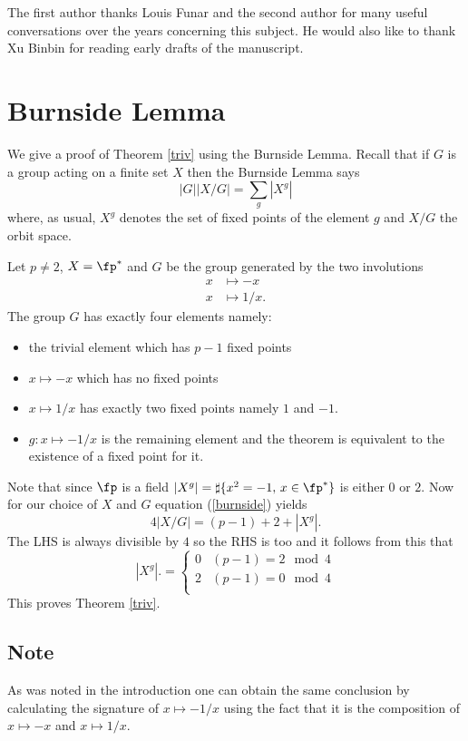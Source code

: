 The first author thanks Louis Funar and the second author for  many useful conversations over the years concerning this subject. He would also like to thank Xu Binbin for reading early drafts of the manuscript.


\section{Burnside Lemma}

We give a proof of Theorem \ref{triv} using the Burnside Lemma.
Recall that if $G$ is  a group acting on a finite set $X$ then the Burnside Lemma says
\begin{equation}\label{burnside}
|G| |X/G| = \sum_{g} |X^g| 
\end{equation}  
where, as usual, 
 $X^g$ denotes the set of fixed points of the element $g$ 
 and $X/G$  the orbit space.


Let $p\neq 2$,  $X = \fp^*$ and $G$ be the group generated by the two involutions
\begin{eqnarray*}
x & \mapsto -x \\
x & \mapsto 1/x.
\end{eqnarray*}
The group  $G$ has exactly four elements namely:
\begin{itemize}
\item the trivial element which has  $p-1$ fixed points
\item $x\mapsto -x$ which has no fixed points 
\item  $x\mapsto 1/x$ has exactly two fixed points namely $1$ and $-1$.
\item  $g:x \mapsto -1/x$ is the remaining element and the theorem is equivalent to the existence of a fixed point for it.
\end{itemize}
Note that since $\fp$ is a field 
$|X^g| = \sharp \{x^2 = -1, \, x\in \fp^* \}$
is either $0$ or $2$.
Now for our choice of $X$ and $G$ equation (\ref{burnside}) yields
\begin{equation}
4 |X/G|   = (p-1) + 2 + |X^g|.
\end{equation}  
The LHS is always divisible by $4$ so the  RHS is too and
it follows from this that
$$ |X^g|. = \left\{  \begin{array}{ll}
0 & (p-1) =  2 \mod 4 \\
2 & (p-1) =  0 \mod 4 \\
\end{array}
\right.
$$
This proves Theorem \ref{triv}.

\subsection*{Note}
As was noted in the introduction one can obtain the same conclusion 
by calculating the signature of $x\mapsto -1/x$ 
using the fact that it is  the composition of
$x \mapsto -x$ and $x \mapsto 1/x$.


